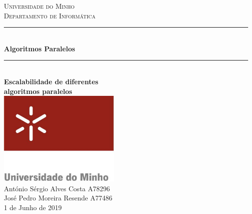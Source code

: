 \documentclass{article}
\begin{document}
\begin{titlepage}

  \newcommand{\HRule}{\rule{\linewidth}{0.5mm}} %

  \center %

  \textsc{\large Universidade do Minho}\\[0.5cm] %
  \textsc{\large Departamento de Informática}\\[2cm] %

  \HRule \\[0.4cm]
  { \huge \bfseries Algoritmos Paralelos}\\[0.4cm] %
  \HRule \\[1cm]

  { \Huge \bfseries Escalabilidade de diferentes}\\[0.4cm]
  { \Huge \bfseries algoritmos paralelos}\\[3cm] %
  \includegraphics[width=6cm]{logo.png}
  \\[4cm]

  \Large
  António Sérgio Alves Costa \textsc{A78296}\\
  José Pedro Moreira Resende \textsc{A77486}\\[2cm]

  \large 1 de Junho de 2019

\end{titlepage}

\tableofcontents

\newpage
\end{document}
